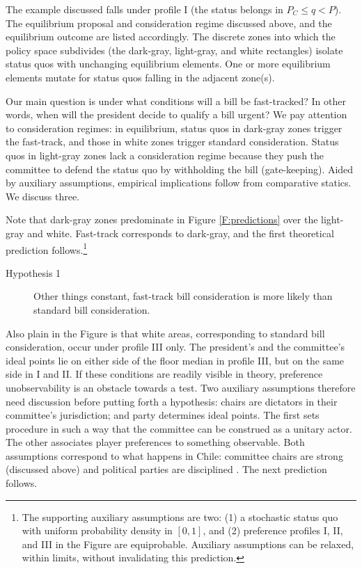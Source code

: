 \documentclass[letter,12pt]{article}
\begin{document}
The example discussed falls under profile I (the status belongs in $P_C \leq q < P$). The equilibrium proposal and consideration regime discussed above, and the equilibrium outcome are listed accordingly. The discrete zones into which the policy space subdivides (the dark-gray, light-gray, and white rectangles) isolate status quos with unchanging equilibrium elements. One or more equilibrium elements mutate for status quos falling in the adjacent zone(s).

Our main question is under what conditions will a bill be fast-tracked? In other words, when will the president decide to qualify a bill urgent?  We pay attention to consideration regimes: in equilibrium, status quos in dark-gray zones trigger the fast-track, and those in white zones trigger standard consideration. Status quos in light-gray zones lack a consideration regime because they push the committee to defend the status quo by withholding the bill (gate-keeping). Aided by auxiliary assumptions, empirical implications follow from comparative statics. We discuss three.

Note that dark-gray zones predominate in Figure \ref{F:predictions} over the light-gray and white. Fast-track corresponds to dark-gray, and the first theoretical prediction follows.\footnote{The supporting auxiliary assumptions are two: (1) a stochastic status quo with uniform probability density in $[0,1]$, and (2) preference profiles I, II, and III in the Figure are equiprobable. Auxiliary assumptions can be relaxed, within limits, without invalidating this prediction.}

\begin{description}
  \item [Hypothesis 1] Other things constant, fast-track bill consideration is more likely than standard bill consideration. 
\end{description}
    
Also plain in the Figure is that white areas, corresponding to standard bill consideration, occur under profile III only. The president's and the committee's ideal points lie on either side of the floor median in profile III, but on the same side in I and II. If these conditions are readily visible in theory, preference unobservability is an obstacle towards a test. Two auxiliary assumptions therefore need discussion before putting forth a hypothesis: chairs are dictators in their committee's jurisdiction; and party determines ideal points. The first sets procedure in such a way that the committee can be construed as a unitary actor. The other associates player preferences to something observable. Both assumptions correspond to what happens in Chile: committee chairs are strong (discussed above) and political parties are disciplined \citep{aleman.saiegh.coalUnityChile.2007,carey.2002}. The next prediction follows. 
\end{document}
